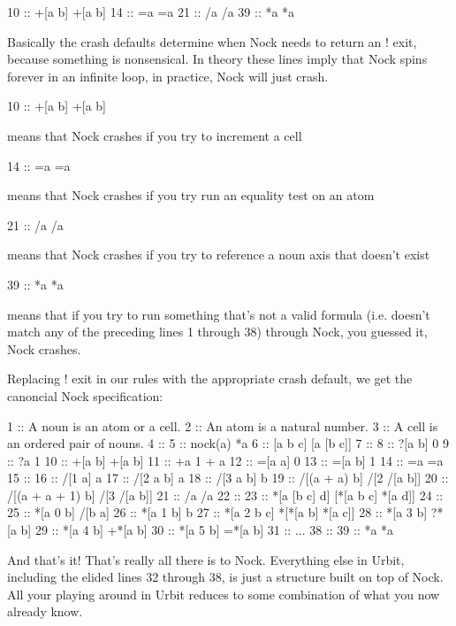 \begin{code}
10 ::    +[a b]           +[a b]
14 ::    =a               =a
21 ::    /a               /a
39 ::    *a               *a
\end{code}
Basically the crash defaults determine when Nock needs to return an ! exit, because something is nonsensical. In theory these lines imply that Nock spins forever in an infinite loop, in practice, Nock will just crash.

\begin{code}
10 ::    +[a b]           +[a b]

\end{code}
means that Nock crashes if you try to increment a cell 

\begin{code}
14 ::    =a               =a
\end{code}
means that Nock crashes if you try run an equality test on an atom

\begin{code}
   21 ::    /a               /a
\end{code}
means that Nock crashes if you try to reference a noun axis that doesn't exist

\begin{code}
39 ::    *a               *a
\end{code}
means that if you try to run something that's not a valid formula (i.e. doesn't match any of the preceding lines 1 through 38) through Nock, you guessed it, Nock crashes.

Replacing ! exit in our rules with the appropriate crash default, we get the canoncial Nock specification:

\begin{code}
1  ::    A noun is an atom or a cell.
2  ::    An atom is a natural number.
3  ::    A cell is an ordered pair of nouns.
4  ::
5  ::    nock(a)          *a
6  ::    [a b c]          [a [b c]]
7  ::
8  ::    ?[a b]           0
9  ::    ?a               1
10 ::    +[a b]           +[a b]
11 ::    +a               1 + a
12 ::    =[a a]           0
13 ::    =[a b]           1
14 ::    =a               =a
15 ::
16 ::    /[1 a]           a
17 ::    /[2 a b]         a
18 ::    /[3 a b]         b
19 ::    /[(a + a) b]     /[2 /[a b]]
20 ::    /[(a + a + 1) b] /[3 /[a b]]
21 ::    /a               /a
22 ::
23 ::    *[a [b c] d]     [*[a b c] *[a d]]
24 ::
25 ::    *[a 0 b]         /[b a]
26 ::    *[a 1 b]         b
27 ::    *[a 2 b c]       *[*[a b] *[a c]]
28 ::    *[a 3 b]         ?*[a b]
29 ::    *[a 4 b]         +*[a b]
30 ::    *[a 5 b]         =*[a b]
31 ::
...
38 ::
39 ::    *a               *a

\end{code}

And that's it! That's really all there is to Nock. Everything else in Urbit, including the elided lines 32 through 38, is just a structure built on top of Nock. All your playing around in Urbit reduces to some combination of what you now already know. 